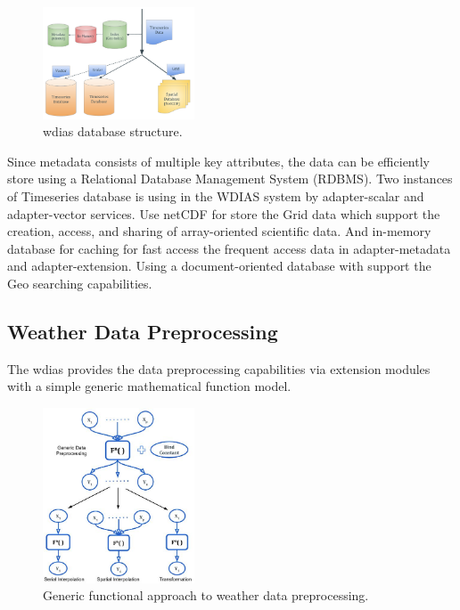 \documentclass[conference]{IEEEtran}
\begin{document}
\begin{figure}[htbp]
\centerline{\includegraphics[width=0.4\textwidth]{method/microservice/wdias_database_structure.pdf}}
\caption{\acrshort{wdias} database structure.}
\label{pfi:database_structure}
\end{figure}

Since metadata consists of multiple key attributes, the data can be efficiently store using a Relational Database Management System (RDBMS). Two instances of Timeseries database is using in the WDIAS system by adapter-scalar and adapter-vector services. Use \acrfull{netCDF} for store the Grid data which support the creation, access, and sharing of array-oriented scientific data. And  in-memory database for caching for fast access the frequent access data in adapter-metadata and adapter-extension. Using a document-oriented database with support the Geo searching capabilities.

\subsection{Weather Data Preprocessing}
\label{psubse:data_preprocessing}

The \acrshort{wdias} provides the data preprocessing capabilities via extension modules with a simple generic mathematical function model.

\begin{figure}[htbp]
\centerline{\includegraphics[width=0.4\textwidth]{method/data_preprocess/summary_weather_data_preprocessing.jpg}}
\caption{Generic functional approach to weather data preprocessing.}
\label{pfi:summary_weather_data_preprocessing}
\end{figure}
\end{document}

